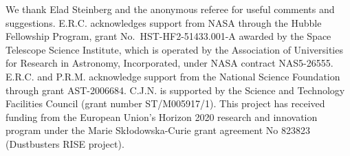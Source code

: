 \documentclass[twocolumn]{aastex62}
\begin{document}
\acknowledgements
We thank Elad Steinberg and the anonymous referee for useful comments and suggestions. E.R.C. acknowledges support from NASA through the Hubble Fellowship Program, grant No.~HST-HF2-51433.001-A awarded by the Space Telescope Science Institute, which is operated by the Association of Universities for Research in Astronomy, Incorporated, under NASA contract NAS5-26555. E.R.C. and P.R.M. acknowledge support from the National Science Foundation through grant AST-2006684. C.J.N. is supported by the Science and Technology Facilities Council (grant number ST/M005917/1). This project has received funding from the European Union’s Horizon 2020 research and innovation program under the Marie Sk\l{}odowska-Curie grant agreement No 823823 (Dustbusters RISE project).

\newpage


%
\end{document}
